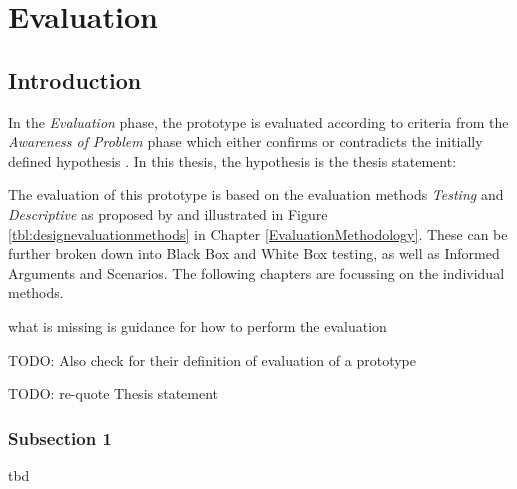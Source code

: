 
\chapter{Evaluation}

\label{ChapterEvaluation}


\section{Introduction}

In the \textit{Evaluation} phase, the prototype is evaluated according to criteria from the \textit{Awareness of Problem} phase which either confirms or contradicts the initially defined hypothesis \citep{Vaishnavi2008}. In this thesis, the hypothesis is the thesis statement:
\begin{framed}
	\textit{\thesisstatementtext}
\end{framed}
The evaluation of this prototype is based on the evaluation methods \textit{Testing} and \textit{Descriptive} as proposed by \cite{Hevner2004} and illustrated in Figure \ref{tbl:designevaluationmethods} in Chapter \ref{EvaluationMethodology}. These can be further broken down into Black Box and White Box testing, as well as Informed Arguments and Scenarios. The following chapters are focussing on the individual methods.



what is missing is guidance for how to perform the evaluation


TODO: Also check \cite{Peffers2012} for their definition of evaluation of a prototype

TODO: re-quote Thesis statement



\subsection{Subsection 1}

tbd


